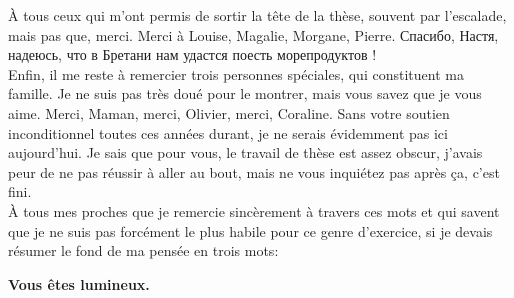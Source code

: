 À tous ceux qui m'ont permis de sortir la tête de la thèse, souvent par l'escalade, mais pas que, merci. Merci à Louise, Magalie, Morgane, Pierre. \selectfont Спасибо, Настя, надеюсь, что в Бретани нам удастся поесть морепродуктов !\selectfont \\

Enfin, il me reste à remercier trois personnes spéciales, qui constituent ma famille. Je ne suis pas très doué pour le montrer, mais vous savez que je vous aime. Merci, Maman, merci, Olivier, merci, Coraline. Sans votre soutien inconditionnel toutes ces années durant, je ne serais évidemment pas ici aujourd'hui. Je sais que pour vous, le travail de thèse est assez obscur, j'avais peur de ne pas réussir à aller au bout, mais ne vous inquiétez pas après ça, c'est fini. \\

À tous mes proches que je remercie sincèrement à travers ces mots et qui savent que je ne suis pas forcément le plus habile pour ce genre d'exercice, si je devais résumer le fond de ma pensée en trois mots: \\
\begin{center}
\Large \textbf{Vous êtes lumineux.}
\end{center}

